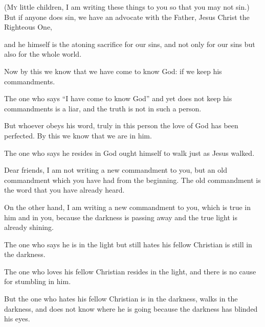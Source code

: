 \begin{scripture}
 \allowchapbreak\hypertarget{ch-1john-2}{}(\lettrine[lines=5]{\color{general}M}{\textsc{y}} little children, I am writing these things to you so that you may not sin.) But if anyone does sin, we have an advocate with the Father, Jesus Christ the Righteous One,\everypar{}
 and he himself is the atoning sacrifice for our sins, and not only for our sins but also for the whole world.
\\\indent{} Now by this we know that we have come to know God: if we keep his commandments.
 The one who says ``I have come to know God'' and yet does not keep his commandments is a liar, and the truth is not in such a person.
 But whoever obeys his word, truly in this person the love of God has been perfected. By this we know that we are in him.
 The one who says he resides in God ought himself to walk just as Jesus walked.
\everypar{}

 Dear friends, I am not writing a new commandment to you, but an old commandment which you have had from the beginning. The old commandment is the word that you have already heard.
 On the other hand, I am writing a new commandment to you, which is true in him and in you, because the darkness is passing away and the true light is already shining.
 The one who says he is in the light but still hates his fellow Christian is still in the darkness.
 The one who loves his fellow Christian resides in the light, and there is no cause for stumbling in him.
 But the one who hates his fellow Christian is in the darkness, walks in the darkness, and does not know where he is going because the darkness has blinded his eyes.
\everypar{}


\end{scripture}

